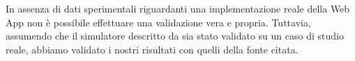In assenza di dati sperimentali riguardanti una implementazione reale della Web App non è possibile effettuare una validazione vera e propria. Tuttavia, assumendo che il simulatore descritto da \citet{DBLP:books/sp/Serazzi24} sia stato validato su un caso di studio reale, abbiamo validato i nostri risultati con quelli della fonte citata.